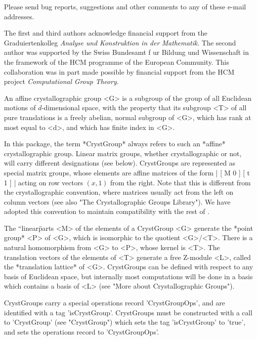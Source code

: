 Please send bug reports,  suggestions and other  comments to any of these
e-mail addresses.

The   first and  third  authors acknowledge  financial  support from  the
Graduiertenkolleg {\it Ana\-lyse und Konstruktion in der Mathematik}. The
second author   was supported  by the  Swiss  Bundesamt  f{ u}r
Bildung und Wissenschaft  in the framework  of the  HCM programme of  the
European   Community.  This collaboration was in   part  made possible by
financial support from the HCM project {\it Computational Group Theory}.


An  affine crystallographic group  <G> is a  subgroup of the group of all
Euclidean motions of $d$-dimensional  space,  with the property that  its
subgroup  <T> of   all pure  translations  is  a  freely abelian,  normal
subgroup of  <G>,  which has rank at  most  equal to <d>,   and which has
finite index in <G>.
 
In this package, the term *CrystGroup* always  refers to such an *affine*
crystallographic group. Linear matrix groups, whether crystallographic or
not,  will carry  different  designations  (see  below).  CrystGroups are
represented as special matrix groups, whose  elements are affine matrices
of the form
|
                     [ M 0 ]
                     [ t 1 ]
|
acting on row vectors $(x,1)$ from the right. Note that this is different
from the crystallographic convention, where matrices usually act from the
left on column vectors (see also  "The Crystallographic Groups Library").
We have  adopted this convention  to maintain compatibility with the rest
of {\GAP}.

The ``linear\" parts <M> of the elements of a CrystGroup <G> generate the
*point  group*  <P>   of  <G>,  which   is isomorphic   to  the  quotient
<G>/<T>. There is a natural homomorphism from <G> to <P>, whose kernel is
<T>.   The  translation vectors of the   elements of <T>  generate a free
Z-module <L>, called the *translation  lattice* of <G>.  CrystGroups  can
be defined  with respect to any  basis of Euclidean space, but internally
most computations will be done in a  basis which contains  a basis of <L>
(see "More about Crystallographic Groups").

CrystGroups carry  a special  operations record 'CrystGroupOps',  and are
identified with  a tag  'isCrystGroup'.  CrystGroups must  be constructed
with  a call to   'CrystGroup'  (see "CrystGroup")  which  sets  the  tag
'isCrystGroup'  to    'true',   and sets     the  operations  record   to
'CrystGroupOps'.

